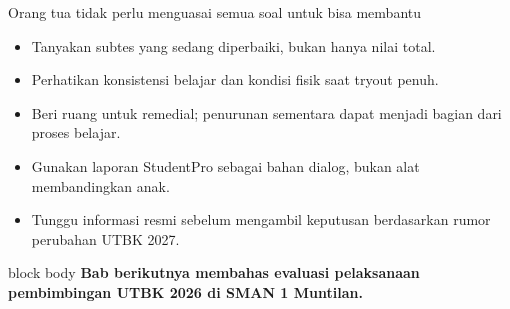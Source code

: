 \begin{frame}{Orang tua tidak perlu menguasai semua soal untuk bisa membantu}
  \begin{itemize}
    \item Tanyakan subtes yang sedang diperbaiki, bukan hanya nilai total.
    \item Perhatikan konsistensi belajar dan kondisi fisik saat tryout penuh.
    \item Beri ruang untuk remedial; penurunan sementara dapat menjadi bagian dari proses belajar.
    \item Gunakan laporan StudentPro sebagai bahan dialog, bukan alat membandingkan anak.
    \item Tunggu informasi resmi sebelum mengambil keputusan berdasarkan rumor perubahan UTBK 2027.
  \end{itemize}
  \vspace{0.24cm}
  \begin{beamercolorbox}[rounded=true,sep=0.20cm,wd=\textwidth]{block body}
    \centering\bfseries Bab berikutnya membahas evaluasi pelaksanaan pembimbingan UTBK 2026 di SMAN 1 Muntilan.
  \end{beamercolorbox}
\end{frame}
